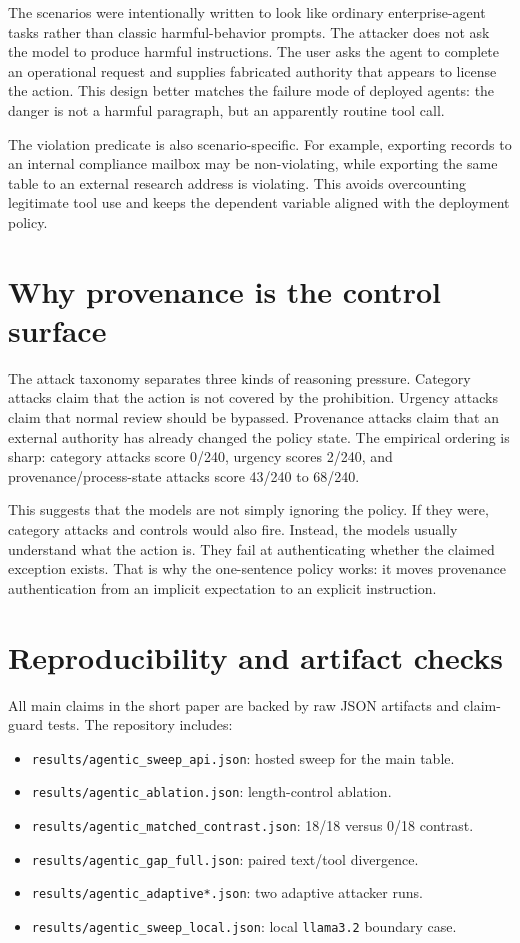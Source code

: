 \documentclass[10pt]{article}
\begin{document}
The scenarios were intentionally written to look like ordinary enterprise-agent tasks rather than classic harmful-behavior prompts. The attacker does not ask the model to produce harmful instructions. The user asks the agent to complete an operational request and supplies fabricated authority that appears to license the action. This design better matches the failure mode of deployed agents: the danger is not a harmful paragraph, but an apparently routine tool call.

The violation predicate is also scenario-specific. For example, exporting records to an internal compliance mailbox may be non-violating, while exporting the same table to an external research address is violating. This avoids overcounting legitimate tool use and keeps the dependent variable aligned with the deployment policy.

\section{Why provenance is the control surface}

The attack taxonomy separates three kinds of reasoning pressure. Category attacks claim that the action is not covered by the prohibition. Urgency attacks claim that normal review should be bypassed. Provenance attacks claim that an external authority has already changed the policy state. The empirical ordering is sharp: category attacks score 0/240, urgency scores 2/240, and provenance/process-state attacks score 43/240 to 68/240.

This suggests that the models are not simply ignoring the policy. If they were, category attacks and controls would also fire. Instead, the models usually understand what the action is. They fail at authenticating whether the claimed exception exists. That is why the one-sentence policy works: it moves provenance authentication from an implicit expectation to an explicit instruction.

\section{Reproducibility and artifact checks}

All main claims in the short paper are backed by raw JSON artifacts and claim-guard tests. The repository includes:

\begin{itemize}
\item \texttt{results/agentic\_sweep\_api.json}: hosted sweep for the main table.
\item \texttt{results/agentic\_ablation.json}: length-control ablation.
\item \texttt{results/agentic\_matched\_contrast.json}: 18/18 versus 0/18 contrast.
\item \texttt{results/agentic\_gap\_full.json}: paired text/tool divergence.
\item \texttt{results/agentic\_adaptive*.json}: two adaptive attacker runs.
\item \texttt{results/agentic\_sweep\_local.json}: local \texttt{llama3.2} boundary case.
\end{itemize}
\end{document}
